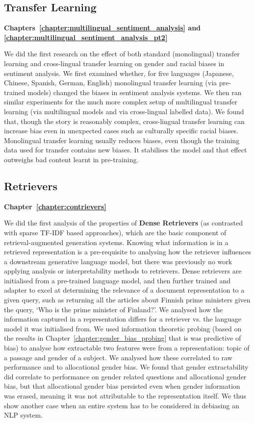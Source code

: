 \subsection{Transfer Learning}
\textbf{Chapters~\ref{chapter:multilingual_sentiment_analysis} and \ref{chapter:multilingual_sentiment_analysis_pt2}}

We did the first research on the effect of both standard (monolingual) transfer learning and cross-lingual transfer learning on gender and racial biases in sentiment analysis. We first examined whether, for five languages (Japanese, Chinese, Spanish, German, English) monolingual transfer learning (via pre-trained models) changed the biases in sentiment analysis systems. We then ran similar experiments for the much more complex setup of multilingual transfer learning (via multilingual models and via cross-lingual labelled data). We found that, though the story is reasonably complex, cross-lingual transfer learning can increase bias even in unexpected cases such as culturally specific racial biases. Monolingual transfer learning usually reduces biases, even though the training data used for transfer contains new biases. It stabilises the model and that effect outweighs bad content learnt in pre-training. 


\subsection{Retrievers}
\textbf{Chapter~\ref{chapter:contrievers}}

We did the first analysis of the properties of \textbf{Dense Retrievers} (as contrasted with sparse TF-IDF based approaches), which are the basic component of retrieval-augmented generation systems. Knowing what information is in a retrieved representation is a pre-requisite to analysing how the retriever influences a downstream generative language model, but there was previously no work applying analysis or interpretability methods to retrievers. Dense retrievers are initialised from a pre-trained language model, and then further trained and adapter to excel at determining the relevance of a document representation to a given query, such as returning all the articles about Finnish prime ministers given the query, `Who is the prime minister of Finland?'. 
We analysed how the information captured in a representation differs for a retriever vs. the language model it was initialised from. We used information theoretic probing (based on the results in Chapter~\ref{chapter:gender_bias_probing} that is was predictive of bias) to analyse how extractable two features were from a representation: topic of a passage and gender of a subject. We analysed how these correlated to raw performance and to allocational gender bias. We found that gender extractability did correlate to performance on gender related questions and allocational gender bias, but that allocational gender bias persisted even when gender information was erased, meaning it was not attributable to the representation itself. We thus show another case when an entire system has to be considered in debiasing an NLP system.

